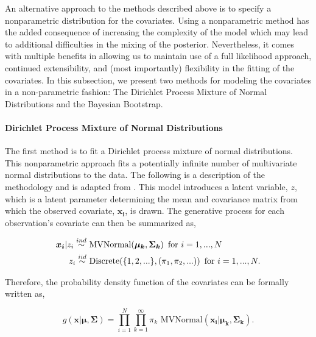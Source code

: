 \documentclass[
  12pt,
]{article}
\begin{document}
An alternative approach to the methods described above is to specify a
nonparametric distribution for the covariates. Using a nonparametric
method has the added consequence of increasing the complexity of the
model which may lead to additional difficulties in the mixing of the
posterior. Nevertheless, it comes with multiple benefits in allowing us
to maintain use of a full likelihood approach, continued extensibility,
and (most importantly) flexibility in the fitting of the covariates. In
this subsection, we present two methods for modeling the covariates in a
non-parametric fashion: The Dirichlet Process Mixture of Normal
Distributions and the Bayesian Bootstrap.

\paragraph{Dirichlet Process Mixture of Normal Distributions}\hspace{5px} \newline

The first method is to fit a Dirichlet process mixture of normal
distributions. This nonparametric approach fits a potentially infinite
number of multivariate normal distributions to the data. The following
is a description of the methodology and is adapted from
\cite{gelman_bayesian_2014}. This model introduces a latent variable,
\(z\), which is a latent parameter determining the mean and covariance
matrix from which the observed covariate, \(\boldsymbol{x_i}\), is
drawn. The generative process for each observation's covariate can then
be summarized as,

\begin{align}
\boldsymbol{x_i}|z_i \stackrel{ind}{\sim} & \text{ MVNormal}(\boldsymbol{\mu_k},\boldsymbol{\Sigma_k}) \hspace{5px} \text{for } i=1,...,N\\
z_i \stackrel{iid}{\sim} & \text{ Discrete}(\{1,2,...\},(\pi_1,\pi_2,...)) \hspace{5px} \text{for } i=1,...,N.
\end{align}

Therefore, the probability density function of the covariates can be
formally written as,

\begin{equation}
g(\boldsymbol{x}|\boldsymbol{\mu},\boldsymbol{\Sigma}) = \prod_{i=1}^N \prod_{k=1}^\infty \pi_k \text{ MVNormal}(\boldsymbol{x_i}|\boldsymbol{\mu_k},\boldsymbol{\Sigma_k}).
\end{equation}
\end{document}
